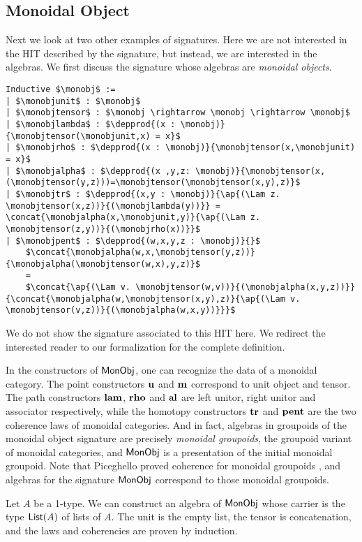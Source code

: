 \subsection{Monoidal Object}
\label{sec:monoidal_object}
Next we look at two other examples of signatures.
Here we are not interested in the HIT described by the signature, but instead, we are interested in the algebras.
We first discuss the signature whose algebras are \emph{monoidal objects}.
\begin{lstlisting}[mathescape=true]
Inductive $\monobj$ :=
| $\monobjunit$ : $\monobj$
| $\monobjtensor$ : $\monobj \rightarrow \monobj \rightarrow \monobj$
| $\monobjlambda$ : $\depprod{(x : \monobj)}{\monobjtensor(\monobjunit,x) = x}$
| $\monobjrho$ : $\depprod{(x : \monobj)}{\monobjtensor(x,\monobjunit) = x}$
| $\monobjalpha$ : $\depprod{(x ,y,z: \monobj)}{\monobjtensor(x,(\monobjtensor(y,z)))=\monobjtensor(\monobjtensor(x,y),z)}$
| $\monobjtr$ : $\depprod{(x,y : \monobj)}{\ap{(\Lam z. \monobjtensor(x,z))}{(\monobjlambda(y))}} = \concat{\monobjalpha(x,\monobjunit,y)}{\ap{(\Lam z. \monobjtensor(z,y))}{(\monobjrho(x))}}$
| $\monobjpent$ : $\depprod{(w,x,y,z : \monobj)}{}$
    $\concat{\monobjalpha(w,x,\monobjtensor(y,z))}{\monobjalpha(\monobjtensor(w,x),y,z)}$
    =
    $\concat{\ap{(\Lam v. \monobjtensor(w,v))}{(\monobjalpha(x,y,z))}}{\concat{\monobjalpha(w,\monobjtensor(x,y),z)}{\ap{(\Lam v. \monobjtensor(v,z))}{(\monobjalpha(w,x,y))}}}$
\end{lstlisting}
We do not show the signature associated to this HIT here. We redirect
the interested reader to our formalization for the complete
definition.

In the constructors of $\mathsf{MonObj}$, one can recognize the data of a
monoidal category. The point constructors $\operatorname{\mathbf{u}}$ and
$\operatorname{\mathbf{m}}$ correspond to unit object and tensor. The path
constructors $\operatorname{\mathbf{lam}}$, $\operatorname{\mathbf{rho}}$ and $\operatorname{\mathbf{al}}$ are left
unitor, right unitor and associator respectively, while the homotopy constructors
$\operatorname{\mathbf{tr}}$ and $\operatorname{\mathbf{pent}}$ are the two coherence laws of
monoidal categories. And in fact, algebras in groupoids of the
monoidal object signature are precisely
\emph{monoidal groupoids}, the groupoid variant of monoidal
categories, and $\mathsf{MonObj}$ is a presentation of the initial
monoidal groupoid.
Note that Piceghello proved coherence for monoidal groupoids \cite{Piceghello19}, and algebras for the signature $\mathsf{MonObj}$ correspond to those monoidal groupoids.

\begin{example}
Let $A$ be a 1-type.
We can construct an algebra of $\mathsf{MonObj}$ whose carrier is the type $\mathsf{List}(A)$ of lists of $A$.
The unit is the empty list, the tensor is concatenation, and the laws and coherencies are proven by induction.
\end{example}


